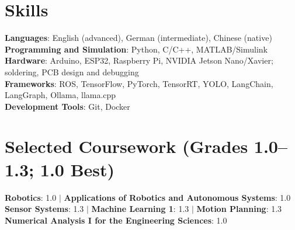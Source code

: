 \documentclass[letterpaper,11pt]{article}
\begin{document}
\section{Skills}
 \begin{itemize}[leftmargin=0.15in, label={}]
    \small{\item{
     \textbf{Languages}{: English (advanced), German (intermediate), Chinese (native)} \\
     \textbf{Programming and Simulation}{: Python, C/C++, MATLAB/Simulink} \\
     \textbf{Hardware}{: Arduino, ESP32, Raspberry Pi, NVIDIA Jetson Nano/Xavier; soldering, PCB design and debugging} \\
     \textbf{Frameworks}{: ROS, TensorFlow, PyTorch, TensorRT, YOLO, LangChain, LangGraph, Ollama, llama.cpp}\\
     \textbf{Development Tools}{: Git, Docker}
    }}
 \end{itemize}

\section{Selected Coursework (Grades 1.0--1.3; 1.0 Best)}
 \begin{itemize}[leftmargin=0.15in, label={}]
    \small{\item{
     \textbf{Robotics}{: 1.0} $|$
     \textbf{Applications of Robotics and Autonomous Systems}{: 1.0} \\
     \textbf{Sensor Systems}{: 1.3} $|$
     \textbf{Machine Learning 1}{: 1.3} $|$
     \textbf{Motion Planning}{: 1.3} \\
     \textbf{Numerical Analysis I for the Engineering Sciences}{: 1.0}
    }}
 \end{itemize}

\end{document}
